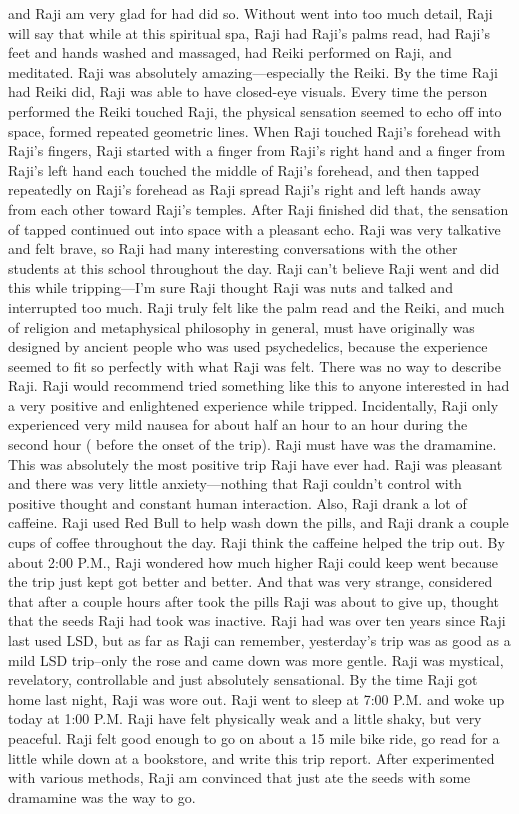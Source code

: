 \documentclass[12pt]{book}
\begin{document}
and Raji am very glad for had did so. Without went into too much detail, Raji will say that while at this spiritual spa, Raji had Raji's palms read, had Raji's feet and hands washed and massaged, had Reiki performed on Raji, and meditated. Raji was absolutely amazing---especially the Reiki. By the time Raji had Reiki did, Raji was able to have closed-eye visuals. Every time the person performed the Reiki touched Raji, the physical sensation seemed to echo off into space, formed repeated geometric lines. When Raji touched Raji's forehead with Raji's fingers, Raji started with a finger from Raji's right hand and a finger from Raji's left hand each touched the middle of Raji's forehead, and then tapped repeatedly on Raji's forehead as Raji spread Raji's right and left hands away from each other toward Raji's temples. After Raji finished did that, the sensation of tapped continued out into space with a pleasant echo. Raji was very talkative and felt brave, so Raji had many interesting conversations with the other students at this school throughout the day. Raji can't believe Raji went and did this while tripping---I'm sure Raji thought Raji was nuts and talked and interrupted too much. Raji truly felt like the palm read and the Reiki, and much of religion and metaphysical philosophy in general, must have originally was designed by ancient people who was used psychedelics, because the experience seemed to fit so perfectly with what Raji was felt. There was no way to describe Raji. Raji would recommend tried something like this to anyone interested in had a very positive and enlightened experience while tripped. Incidentally, Raji only experienced very mild nausea for about half an hour to an hour during the second hour ( before the onset of the trip). Raji must have was the dramamine. This was absolutely the most positive trip Raji have ever had. Raji was pleasant and there was very little anxiety---nothing that Raji couldn't control with positive thought and constant human interaction. Also, Raji drank a lot of caffeine. Raji used Red Bull to help wash down the pills, and Raji drank a couple cups of coffee throughout the day. Raji think the caffeine helped the trip out. By about 2:00 P.M., Raji wondered how much higher Raji could keep went because the trip just kept got better and better. And that was very strange, considered that after a couple hours after took the pills Raji was about to give up, thought that the seeds Raji had took was inactive. Raji had was over ten years since Raji last used LSD, but as far as Raji can remember, yesterday's trip was as good as a mild LSD trip--only the rose and came down was more gentle. Raji was mystical, revelatory, controllable and just absolutely sensational. By the time Raji got home last night, Raji was wore out. Raji went to sleep at 7:00 P.M. and woke up today at 1:00 P.M. Raji have felt physically weak and a little shaky, but very peaceful. Raji felt good enough to go on about a 15 mile bike ride, go read for a little while down at a bookstore, and write this trip report. After experimented with various methods, Raji am convinced that just ate the seeds with some dramamine was the way to go.
\end{document}
